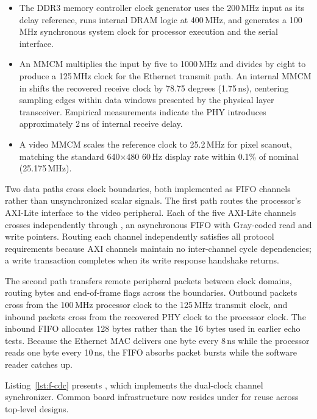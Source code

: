 \documentclass[journal,9pt]{IEEEtran}
\begin{document}
\begin{itemize}
\item The DDR3 memory controller clock generator uses the 200\,MHz input as its
  delay reference, runs internal DRAM logic at 400\,MHz, and generates a
  100\,MHz synchronous system clock for processor execution and the serial
  interface.
\item An MMCM multiplies the input by five to 1000\,MHz and divides by eight to
  produce a 125\,MHz clock for the Ethernet transmit path. An internal MMCM in
   shifts the recovered receive clock by 78.75 degrees
  (1.75\,ns), centering sampling edges within data windows presented by the
  physical layer transceiver. Empirical measurements indicate the PHY
  introduces approximately 2\,ns of internal receive delay.
\item A video MMCM scales the reference clock to 25.2\,MHz for pixel scanout,
  matching the standard 640$\times$480 60\,Hz display rate within 0.1\% of
  nominal (25.175\,MHz).
\end{itemize}

Two data paths cross clock boundaries, both implemented as FIFO channels rather
than unsynchronized scalar signals. The first path routes the processor's
AXI-Lite interface to the video peripheral. Each of the five AXI-Lite channels
crosses independently through , an asynchronous FIFO with
Gray-coded read and write pointers. Routing each channel independently satisfies
all protocol requirements because AXI channels maintain no inter-channel cycle
dependencies; a write transaction completes when its write response handshake
returns.

The second path transfers remote peripheral packets between clock domains,
routing bytes and end-of-frame flags across the boundaries. Outbound packets
cross from the 100\,MHz processor clock to the 125\,MHz transmit clock, and
inbound packets cross from the recovered PHY clock to the processor clock. The
inbound FIFO allocates 128 bytes rather than the 16 bytes used in earlier echo
tests. Because the Ethernet MAC delivers one byte every 8\,ns while the
processor reads one byte every 10\,ns, the FIFO absorbs packet bursts while the
software reader catches up.

Listing~\ref{lst:f-cdc} presents , which implements
the dual-clock channel synchronizer. Common board infrastructure now resides
under  for reuse across top-level designs.


\end{document}
